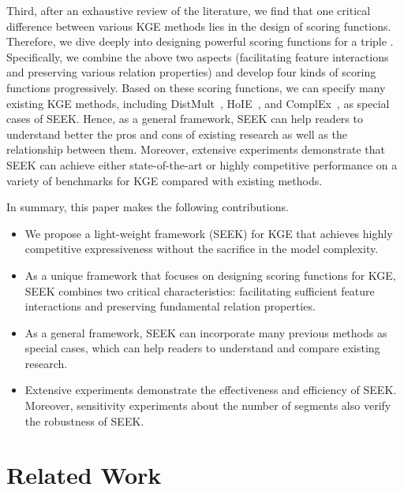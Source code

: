 \documentclass[11pt,a4paper]{article}
\begin{document}
Third, after an exhaustive review of the literature, we find that one critical difference between various KGE methods lies in the design of scoring functions.
Therefore, we dive deeply into designing powerful scoring functions for a triple .
Specifically, we combine the above two aspects (facilitating feature interactions and preserving various relation properties) and develop four kinds of scoring functions progressively.
Based on these scoring functions, we can specify many existing KGE methods, including DistMult~\cite{yang2015embedding}, HoIE~\cite{nickel2016holographic}, and ComplEx~\cite{trouillon2016complex}, as special cases of SEEK.
Hence, as a general framework, SEEK can help readers to understand better the pros and cons of existing research as well as the relationship between them.
Moreover, extensive experiments demonstrate that SEEK can achieve either state-of-the-art or highly competitive performance on a variety of benchmarks for KGE compared with existing methods.

In summary, this paper makes the following contributions.
\begin{itemize}[label={-},leftmargin=1.5em]
	\item We propose a light-weight framework (SEEK) for KGE that achieves highly competitive expressiveness without the sacrifice in the model complexity.
	\item As a unique framework that focuses on designing scoring functions for KGE, SEEK combines two critical characteristics: facilitating sufficient feature interactions and preserving fundamental relation properties.
	\item As a general framework, SEEK can incorporate many previous methods as special cases, which can help readers to understand and compare existing research.
	\item Extensive experiments demonstrate the effectiveness and efficiency of SEEK. Moreover, sensitivity experiments about the number of segments also verify the robustness of SEEK. 
\end{itemize}


 \section{Related Work}
\label{sec:related}
\end{document}
